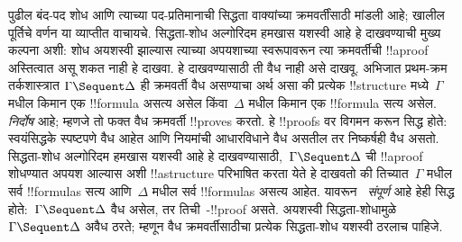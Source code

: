 \documentclass[../../../include/open-logic-section]{subfiles}
\begin{document}
पुढील बंद-पद शोध आणि त्याच्या पद-प्रतिमानाची सिद्धता
वाक्यांच्या क्रमवर्तींसाठी मांडली आहे; खालील पूर्तिचे
वर्णन या व्याप्तीत वाचायचे.
सिद्धता-शोध अल्गोरिदम हमखास यशस्वी आहे
हे दाखवण्याची मुख्य कल्पना अशी: शोध अयशस्वी
झाल्यास त्याच्या अपयशाच्या स्वरूपावरून त्या
क्रमवर्तीची !!a{proof} अस्तित्वात असू शकत नाही हे दाखवा.
हे दाखवण्यासाठी ती वैध नाही असे दाखवू.
अभिजात प्रथम-क्रम तर्कशास्त्रात
$\Gamma \Sequent \Delta$ ही क्रमवर्ती वैध
असण्याचा अर्थ असा की प्रत्येक !!{structure}
मध्ये~$\Gamma$ मधील किमान एक !!{formula}
असत्य असेल किंवा~$\Delta$ मधील किमान एक
!!{formula} सत्य असेल.  \emph{निर्दोष}
आहे; म्हणजे तो फक्त वैध क्रमवर्ती !!{prove}s करतो.
हे !!{proof}s वर विगमन करून सिद्ध होते:
स्वयंसिद्धके स्पष्टपणे वैध आहेत आणि नियमांची
आधारविधाने वैध असतील तर निष्कर्षही वैध असतो.
सिद्धता-शोध अल्गोरिदम हमखास यशस्वी आहे हे
दाखवण्यासाठी,~$\Gamma \Sequent \Delta$ ची
!!a{proof} शोधण्यात अपयश आल्यास अशी
!!a{structure} परिभाषित करता येते हे दाखवतो
की तिच्यात~$\Gamma$ मधील सर्व !!{formula}s
सत्य आणि~$\Delta$ मधील सर्व !!{formula}s
असत्य आहेत. यावरून~ \emph{संपूर्ण}
आहे हेही सिद्ध होते:~$\Gamma \Sequent \Delta$
वैध असेल, तर तिची~-!!{proof} असते.
अयशस्वी सिद्धता-शोधामुळे~$\Gamma \Sequent \Delta$
अवैध ठरते; म्हणून वैध क्रमवर्तीसाठीचा प्रत्येक
सिद्धता-शोध यशस्वी ठरलाच पाहिजे.
\end{document}
